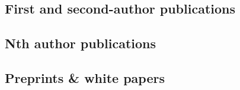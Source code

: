 \documentclass[letterpaper,12pt,preprint]{article}
\begin{document}


\subsection*{First and second-author publications}

\begin{list}{}{\cvlist}

\end{list}

\subsection*{Nth author publications}

\begin{list}{}{\cvlist}

\end{list}

\subsection*{Preprints \& white papers}

\begin{list}{}{\cvlist}

\end{list}
\end{document}
